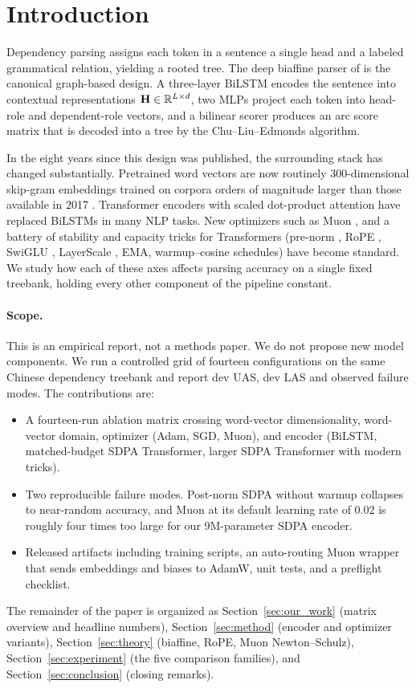 \section{Introduction}
\label{sec:intro}

Dependency parsing assigns each token in a sentence a single head and a labeled grammatical relation, yielding a rooted tree. The deep biaffine parser of \citet{dozat2017biaffine} is the canonical graph-based design. A three-layer BiLSTM encodes the sentence into contextual representations $\mathbf{H}\in\mathbb{R}^{L\times d}$, two MLPs project each token into head-role and dependent-role vectors, and a bilinear scorer produces an arc score matrix that is decoded into a tree by the Chu--Liu--Edmonds algorithm.

In the eight years since this design was published, the surrounding stack has changed substantially. Pretrained word vectors are now routinely 300-dimensional skip-gram embeddings trained on corpora orders of magnitude larger than those available in 2017 \citep{li2018cwv}. Transformer encoders with scaled dot-product attention \citep{vaswani2017attention} have replaced BiLSTMs in many NLP tasks. New optimizers such as Muon \citep{jordan2024muon}, and a battery of stability and capacity tricks for Transformers (pre-norm \citep{xiong2020lnorder}, RoPE \citep{su2021roformer}, SwiGLU \citep{shazeer2020glu}, LayerScale \citep{touvron2021cait}, EMA, warmup--cosine schedules) have become standard. We study how each of these axes affects parsing accuracy on a single fixed treebank, holding every other component of the pipeline constant.

\paragraph{Scope.} This is an empirical report, not a methods paper. We do not propose new model components. We run a controlled grid of fourteen configurations on the same Chinese dependency treebank and report dev UAS, dev LAS and observed failure modes. The contributions are:
\begin{itemize}[leftmargin=*, itemsep=2pt]
  \item A fourteen-run ablation matrix crossing word-vector dimensionality, word-vector domain, optimizer (Adam, SGD, Muon), and encoder (BiLSTM, matched-budget SDPA Transformer, larger SDPA Transformer with modern tricks).
  \item Two reproducible failure modes. Post-norm SDPA without warmup collapses to near-random accuracy, and Muon at its default learning rate of $0.02$ is roughly four times too large for our 9M-parameter SDPA encoder.
  \item Released artifacts including training scripts, an auto-routing Muon wrapper that sends embeddings and biases to AdamW, unit tests, and a preflight checklist.
\end{itemize}

The remainder of the paper is organized as Section~\ref{sec:our_work} (matrix overview and headline numbers), Section~\ref{sec:method} (encoder and optimizer variants), Section~\ref{sec:theory} (biaffine, RoPE, Muon Newton--Schulz), Section~\ref{sec:experiment} (the five comparison families), and Section~\ref{sec:conclusion} (closing remarks).
